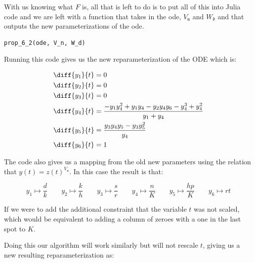 \documentclass[oneside, a4paper, onecolumn, 11pt]{article}
\begin{document}
With us knowing what \(F\) is, all that is left to do is to put all of this into Julia code and we are left with a function that takes in the ode, \(V_{\mathfrak{n}}\) and \(W_{\mathfrak{d}}\) and that outputs the new parameterizations of the ode.
\begin{lstlisting}
prop_6_2(ode, V_n, W_d)
\end{lstlisting}

Running this code gives us the new reparameterization of the ODE which is:

\begin{align*}
    \diff{y_1}{t} & = 0                                                                    \\
    \diff{y_2}{t} & = 0                                                                    \\
    \diff{y_3}{t} & = 0                                                                    \\
    \diff{y_4}{t} & = \frac{-y_1 y_4^2 + y_1 y_4 - y_2 y_4 y_6 - y_4^3 + y_4^2}{y_1 + y_4} \\
    \diff{y_5}{t} & = \frac{y_3 y_4 y_5 - y_3 y_5^2}{y_4}                                  \\
    \diff{y_6}{t} & = 1
\end{align*}

The code also gives us a mapping from the old new parameters using the relation that \(y(t) = z(t)^{V_\mathfrak{n}}\). In this case the result is that:

\[
    y_1 \mapsto \frac{d}{k} \qquad
    y_2 \mapsto \frac{k}{h} \qquad
    y_3 \mapsto \frac{s}{r} \qquad
    y_4 \mapsto \frac{n}{K} \qquad
    y_5 \mapsto \frac{hp}{K} \qquad
    y_6 \mapsto r t
\]

If we were to add the additional constraint that the variable \(t\) was not scaled, which would be equivalent to adding a column of zeroes with a one in the last spot to \(K\).

Doing this our algorithm will work similarly but will not rescale \(t\), giving us a new resulting reparameterization as:
\end{document}
